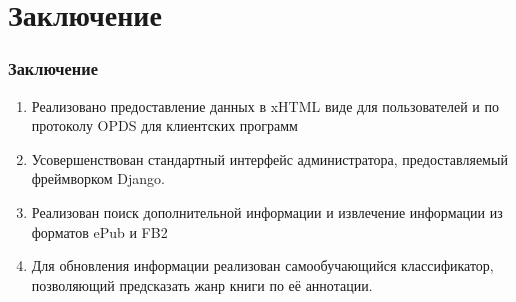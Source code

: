\documentclass[handout]{beamer}
\begin{document}
\section{Заключение}
  \begin{frame}
    \frametitle{Заключение}
    \begin{enumerate}
      \item Реализовано предоставление данных в xHTML виде для пользователей и по протоколу OPDS для клиентских программ	  
	  \item Усовершенствован стандартный интерфейс администратора, предоставляемый фреймворком Django.
	  \item Реализован поиск дополнительной информации и извлечение информации из форматов ePub и FB2
      \item Для обновления информации реализован самообучающийся классификатор, позволяющий предсказать жанр книги по её аннотации.
	  
    \end{enumerate}
  \end{frame}
\end{document}

